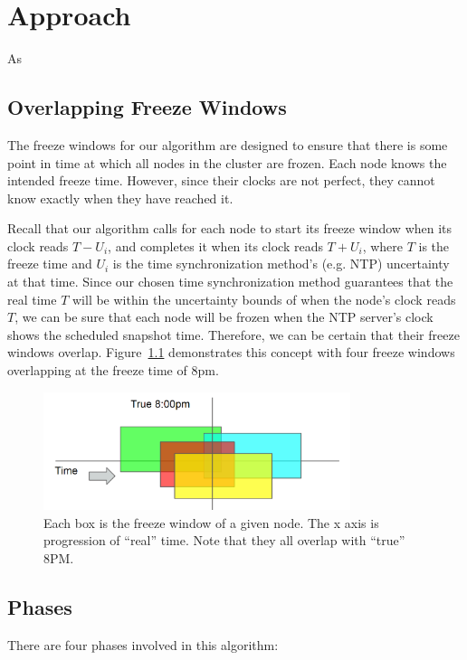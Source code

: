 \chapter{Approach}
\label{sec:approach}

As 

\section{Overlapping Freeze Windows}

The freeze windows for our algorithm are designed to ensure
that there is some point in time at which all nodes in the cluster are
frozen. Each node knows the intended freeze time. However, since their
clocks are not perfect, they cannot know exactly when they have reached it.

Recall that our algorithm calls for each node to start its freeze
window when its clock reads $T - U_i$, and completes it when its clock
reads $T + U_i$, where $T$ is the freeze time and $U_i$ is the time
synchronization method's (e.g. NTP) uncertainty at that time.  Since
our chosen time synchronization method guarantees that the real time
$T$ will be within the uncertainty bounds of when the node's clock
reads $T$, we can be sure that each node will be frozen when the NTP
server's clock shows the scheduled snapshot time. Therefore, we can be
certain that their freeze windows overlap.
Figure~\ref{fig:overlapping-windows} demonstrates this concept with
four freeze windows overlapping at the freeze time of 8pm.

\begin{figure}[h]
  \centering
  \caption{ Each box is the freeze window of a given node. The x axis is progression of “real” time. Note that they all overlap with “true” 8PM.}
  \label{fig:overlapping-windows}
  \includegraphics[width=0.8\textwidth]{overlapping-windows.png}
\end{figure}


\section{Phases}
There are four phases involved in this algorithm:

